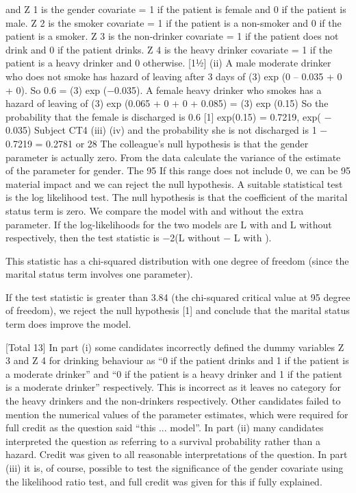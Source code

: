 and
Z 1 is the gender covariate = 1 if the patient is female and 0 if the patient is male.
Z 2 is the smoker covariate = 1 if the patient is a non-smoker and 0 if the patient is a
smoker.
Z 3 is the non-drinker covariate = 1 if the patient does not drink and 0 if the patient
drinks.
Z 4 is the heavy drinker covariate = 1 if the patient is a heavy drinker and 0 otherwise.
[11⁄2]
(ii)
A male moderate drinker who does not smoke has hazard of leaving after 3 days of
 (3) exp (0 – 0.035 + 0 + 0). 
So 0.6 =  (3) exp (−0.035). 
A female heavy drinker who smokes has a hazard of leaving of
 (3) exp (0.065 + 0 + 0 + 0.085) =  (3) exp (0.15)
So the probability that the female is discharged is 0.6
[1]
exp(0.15)
= 0.7219,
exp( − 0.035)
Subject CT4 %
(iii)
(iv)
and the probability she is not discharged is 1 − 0.7219 = 0.2781 or 28%
The colleague’s null hypothesis is that the gender parameter is actually zero. 
From the data calculate the variance of the estimate of the parameter for gender. 
The 95%
If this range does not include 0, we can be 95%
material impact and we can reject the null hypothesis. 
A suitable statistical test is the log likelihood test. 
The null hypothesis is that the coefficient of the marital status term is zero. 
We compare the model with and without the extra parameter. 
If the log-likelihoods for the two models are L with and L without respectively, then the
test statistic is −2(L without − L with ).

This statistic has a chi-squared distribution with one degree of freedom (since the
marital status term involves one parameter).

If the test statistic is greater than 3.84 (the chi-squared critical value at 95%
degree of freedom), we reject the null hypothesis
[1]
and conclude that the marital status term does improve the model.


[Total 13]
In part (i) some candidates incorrectly defined the dummy variables Z 3 and Z 4
for drinking behaviour as “0 if the patient drinks and 1 if the patient is a
moderate drinker” and “0 if the patient is a heavy drinker and 1 if the patient is
a moderate drinker” respectively. This is incorrect as it leaves no category for
the heavy drinkers and the non-drinkers respectively. Other candidates failed
to mention the numerical values of the parameter estimates, which were
required for full credit as the question said “this ... model”. In part (ii) many
candidates interpreted the question as referring to a survival probability rather
than a hazard. Credit was given to all reasonable interpretations of the
question. In part (iii) it is, of course, possible to test the significance of the
gender covariate using the likelihood ratio test, and full credit was given for
this if fully explained.
